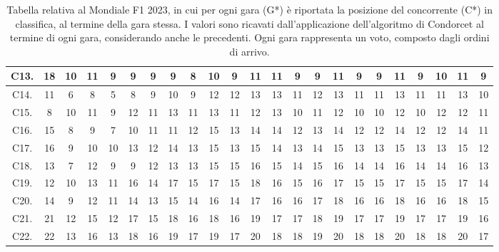 \documentclass[12pt,a4paper,openright,twoside]{book}
\begin{document}
\begin{table}[H]
{\begin{tabular}{|c|c|c|c|c|c|c|c|c|c|c|c|c|c|c|c|c|c|c|c|c|c|c|}
    C13.  & 18 & 10 & 11 & 9 & 9 & 9 & 9 & 8 & 10 & 9 & 11 & 11 & 9 & 9 & 11 & 9 & 9 & 11 & 9 & 10 & 11 & 9 \\ \hline
    C14.  & 11 & 6 & 8 & 5 & 8 & 9 & 10 & 9 & 12 & 12 & 13 & 13 & 11 & 12 & 13 & 11 & 11 & 13 & 11 & 11 & 13 & 10 \\ \hline
    C15.  & 8 & 10 & 11 & 9 & 12 & 11 & 13 & 11 & 13 & 11 & 12 & 13 & 10 & 11 & 12 & 10 & 10 & 12 & 10 & 12 & 12 & 11 \\ \hline
    C16. & 15 & 8 & 9 & 7 & 10 & 11 & 11 & 12 & 15 & 13 & 14 & 14 & 12 & 13 & 14 & 12 & 12 & 14 & 12 & 12 & 14 & 11 \\ \hline
    C17.  & 16 & 9 & 10 & 10 & 13 & 12 & 14 & 13 & 15 & 13 & 15 & 14 & 13 & 14 & 15 & 13 & 13 & 15 & 13 & 13 & 15 & 12 \\ \hline
    C18. & 13 & 7 & 12 & 9 & 9 & 12 & 13 & 13 & 15 & 15 & 16 & 15 & 14 & 15 & 16 & 14 & 14 & 16 & 14 & 14 & 16 & 13 \\ \hline
    C19.  & 12 & 10 & 13 & 11 & 16 & 14 & 17 & 15 & 17 & 15 & 18 & 16 & 15 & 16 & 17 & 15 & 15 & 17 & 15 & 15 & 17 & 14 \\ \hline
    C20.  & 14 & 9 & 12 & 11 & 14 & 13 & 15 & 14 & 16 & 14 & 17 & 16 & 16 & 17 & 18 & 16 & 16 & 18 & 16 & 16 & 18 & 15 \\ \hline
    C21. & 21 & 12 & 15 & 12 & 17 & 15 & 18 & 16 & 18 & 16 & 19 & 17 & 17 & 18 & 19 & 17 & 17 & 19 & 17 & 17 & 19 & 16 \\ \hline
    C22.  & 22 & 13 & 16 & 13 & 18 & 16 & 19 & 17 & 19 & 17 & 20 & 18 & 18 & 19 & 20 & 18 & 18 & 20 & 18 & 18 & 20 & 17 \\ \hline
    \end{tabular}}
    \endgroup

    \caption{Tabella relativa al Mondiale F1 2023, in cui per ogni gara (G*)  è riportata la posizione del concorrente (C*) in classifica, al termine della gara stessa.
    I valori sono ricavati dall'applicazione dell'algoritmo di Condorcet al termine di ogni gara, considerando anche le precedenti.
    Ogni gara rappresenta un voto, composto dagli ordini di arrivo.
    }
    \label{table:classifichegeneralicondorcet2023tabella}
\end{table}
\end{document}
